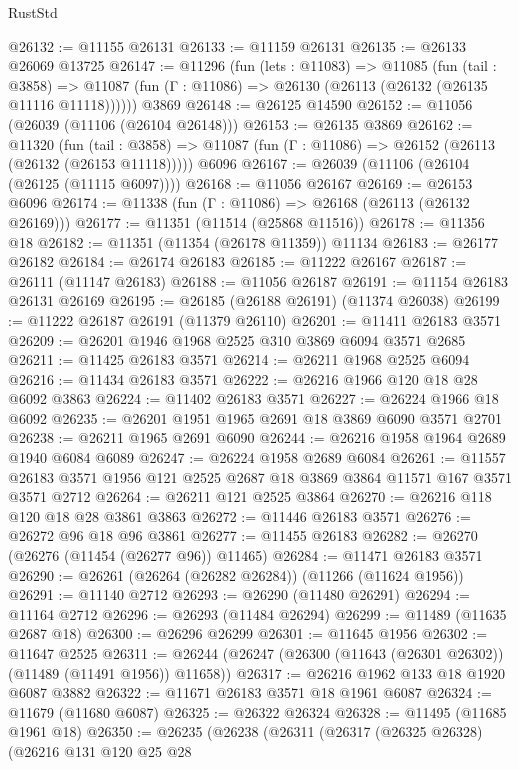 \begin{lexlean}{RustStd}
\begin{coremodule}
@26132 := @11155 @26131
@26133 := @11159 @26131
@26135 := @26133 @26069 @13725
@26147 := @11296
    (fun (lets : @11083) =>
    @11085
      (fun (tail : @3858) =>
      @11087 (fun (Γ : @11086) => @26130 (@26113 (@26132 (@26135 @11116 @11118))))))
    @3869
@26148 := @26125 @14590
@26152 := @11056 (@26039 (@11106 (@26104 @26148)))
@26153 := @26135 @3869
@26162 := @11320
    (fun (tail : @3858) => @11087 (fun (Γ : @11086) => @26152 (@26113 (@26132 (@26153 @11118)))))
    @6096
@26167 := @26039 (@11106 (@26104 (@26125 (@11115 @6097))))
@26168 := @11056 @26167
@26169 := @26153 @6096
@26174 := @11338 (fun (Γ : @11086) => @26168 (@26113 (@26132 @26169)))
@26177 := @11351 (@11514 (@25868 @11516))
@26178 := @11356 @18
@26182 := @11351 (@11354 (@26178 @11359)) @11134
@26183 := @26177 @26182
@26184 := @26174 @26183
@26185 := @11222 @26167
@26187 := @26111 (@11147 @26183)
@26188 := @11056 @26187
@26191 := @11154 @26183 @26131 @26169
@26195 := @26185 (@26188 @26191) (@11374 @26038)
@26199 := @11222 @26187 @26191 (@11379 @26110)
@26201 := @11411 @26183 @3571
@26209 := @26201 @1946 @1968 @2525 @310 @3869 @6094 @3571 @2685
@26211 := @11425 @26183 @3571
@26214 := @26211 @1968 @2525 @6094
@26216 := @11434 @26183 @3571
@26222 := @26216 @1966 @120 @18 @28 @6092 @3863
@26224 := @11402 @26183 @3571
@26227 := @26224 @1966 @18 @6092
@26235 := @26201 @1951 @1965 @2691 @18 @3869 @6090 @3571 @2701
@26238 := @26211 @1965 @2691 @6090
@26244 := @26216 @1958 @1964 @2689 @1940 @6084 @6089
@26247 := @26224 @1958 @2689 @6084
@26261 := @11557 @26183 @3571 @1956 @121 @2525 @2687 @18 @3869 @3864 @11571 @167 @3571 @3571 @2712
@26264 := @26211 @121 @2525 @3864
@26270 := @26216 @118 @120 @18 @28 @3861 @3863
@26272 := @11446 @26183 @3571
@26276 := @26272 @96 @18 @96 @3861
@26277 := @11455 @26183
@26282 := @26270 (@26276 (@11454 (@26277 @96)) @11465)
@26284 := @11471 @26183 @3571
@26290 := @26261 (@26264 (@26282 @26284)) (@11266 (@11624 @1956))
@26291 := @11140 @2712
@26293 := @26290 (@11480 @26291)
@26294 := @11164 @2712
@26296 := @26293 (@11484 @26294)
@26299 := @11489 (@11635 @2687 @18)
@26300 := @26296 @26299
@26301 := @11645 @1956
@26302 := @11647 @2525
@26311 := @26244 (@26247 (@26300 (@11643 (@26301 @26302)) (@11489 (@11491 @1956)) @11658))
@26317 := @26216 @1962 @133 @18 @1920 @6087 @3882
@26322 := @11671 @26183 @3571 @18 @1961 @6087
@26324 := @11679 (@11680 @6087)
@26325 := @26322 @26324
@26328 := @11495 (@11685 @1961 @18)
@26350 := @26235
    (@26238
      (@26311
        (@26317
          (@26325 @26328)
          (@26216
            @131
            @120
            @25
            @28

\end{coremodule}
\end{lexlean}
